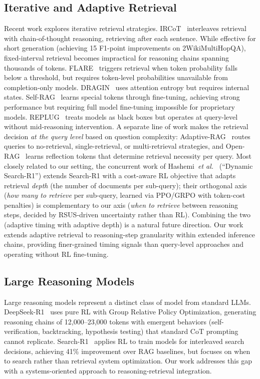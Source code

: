 \documentclass[sigconf,natbib=true]{acmart}
\newcommand{\etal}{\textit{et al.}}
\begin{document}
\subsection{Iterative and Adaptive Retrieval}
Recent work explores iterative retrieval strategies. IRCoT~\cite{trivedi2023ircot} interleaves retrieval with chain-of-thought reasoning, retrieving after each sentence. While effective for short generation (achieving 15 F1-point improvements on 2WikiMultiHopQA), fixed-interval retrieval becomes impractical for reasoning chains spanning thousands of tokens. FLARE~\cite{jiang2023flare} triggers retrieval when token probability falls below a threshold, but requires token-level probabilities unavailable from completion-only models. DRAGIN~\cite{su2024dragin} uses attention entropy but requires internal states. Self-RAG~\cite{asai2024selfrag} learns special tokens through fine-tuning, achieving strong performance but requiring full model fine-tuning impossible for proprietary models. REPLUG~\cite{shi2024replug} treats models as black boxes but operates at query-level without mid-reasoning intervention. A separate line of work makes the retrieval decision \emph{at the query level} based on question complexity: Adaptive-RAG~\cite{jeong2024adaptiverag} routes queries to no-retrieval, single-retrieval, or multi-retrieval strategies, and Open-RAG~\cite{islam2024openrag} learns reflection tokens that determine retrieval necessity per query. Most closely related to our setting, the concurrent work of Hashemi~\etal~\cite{hashemi2026costaware} (``Dynamic Search-R1'') extends Search-R1 with a cost-aware RL objective that adapts retrieval \emph{depth} (the number of documents per sub-query); their orthogonal axis (\emph{how many to retrieve} per sub-query, learned via PPO/GRPO with token-cost penalties) is complementary to our axis (\emph{when to retrieve} between reasoning steps, decided by RSUS-driven uncertainty rather than RL). Combining the two (adaptive timing with adaptive depth) is a natural future direction. Our work extends adaptive retrieval to reasoning-step granularity within extended inference chains, providing finer-grained timing signals than query-level approaches and operating without RL fine-tuning.

\subsection{Large Reasoning Models}
Large reasoning models represent a distinct class of model from standard LLMs. DeepSeek-R1~\cite{deepseek2025r1} uses pure RL with Group Relative Policy Optimization, generating reasoning chains of 12,000--23,000 tokens with emergent behaviors (self-verification, backtracking, hypothesis testing) that standard CoT prompting cannot replicate. Search-R1~\cite{jin2025searchr1} applies RL to train models for interleaved search decisions, achieving 41\% improvement over RAG baselines, but focuses on when to search rather than retrieval system optimization. Our work addresses this gap with a systems-oriented approach to reasoning-retrieval integration.
\end{document}
